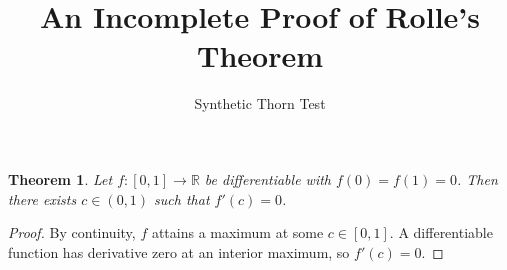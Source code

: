 \documentclass{article}
\newtheorem{theorem}{Theorem}
\begin{document}
\title{An Incomplete Proof of Rolle's Theorem}
\author{Synthetic Thorn Test}
\maketitle

\begin{theorem}\label{thm:missing-justification}
Let $f:[0,1]\to\mathbb{R}$ be differentiable with $f(0)=f(1)=0$. Then there exists $c\in(0,1)$ such that $f'(c)=0$.
\end{theorem}
\begin{proof}
By continuity, $f$ attains a maximum at some $c\in[0,1]$. A differentiable function has derivative zero at an interior maximum, so $f'(c)=0$.
\end{proof}
\end{document}
